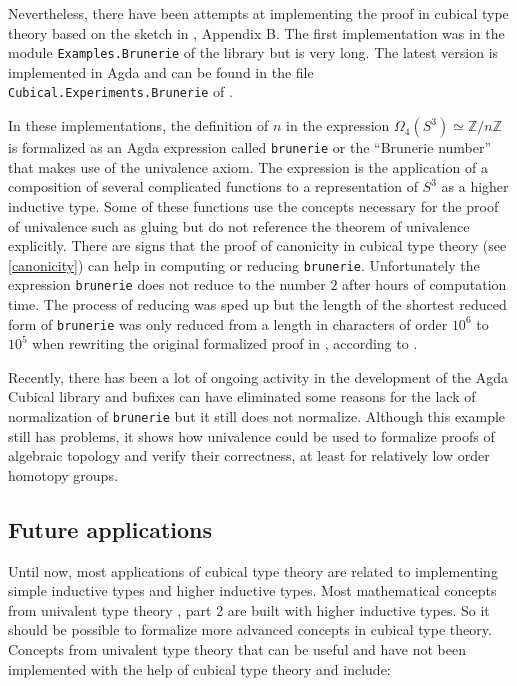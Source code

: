 \documentclass[12pt,a4paper,twoside,xetex]{book} %
\begin{document}
Nevertheless, there have been attempts at implementing the proof in cubical type 
theory based on the sketch in \cite{Brunerie2016}, Appendix B. The first 
implementation was in the module \texttt{Examples.Brunerie} of the library 
\cite{Moertberg2015} but is very long. The latest version is implemented in Agda 
and can be found in the file  \texttt{Cubical.Experiments.Brunerie} of 
\cite{Moertberg2018}. 

In these implementations, the definition of  $n$ in the expression 
$\Omega_4(S^3) \simeq \mathbb{Z}/n\mathbb{Z}$ is formalized as an Agda 
expression called \texttt{brunerie} or the ``Brunerie number'' that makes use 
of the univalence axiom. The expression is the application of a composition of 
several complicated functions to a representation of $S^3$ as a higher 
inductive type. Some of these functions use the concepts necessary for the proof 
of univalence such as gluing but do not reference the theorem of 
univalence explicitly. There are signs that the proof of canonicity in 
cubical type theory (see \cref{canonicity}) can help in computing 
or reducing \texttt{brunerie}. Unfortunately the expression 
\texttt{brunerie} does not reduce to the number $2$ after hours of 
computation time. The process of reducing was sped up but the length of the
shortest reduced form of  \texttt{brunerie} was  only 
reduced from a length in characters of order $10^6$ to $10^5$ when rewriting 
the original formalized proof \cite{Moertberg2015} in \cite{Moertberg2018},  
according to \cite{Brunerie2018}.

Recently, there has been a lot of ongoing activity in the development of the 
Agda Cubical library and bufixes can have eliminated some reasons for the lack 
of normalization of \texttt{brunerie} but it still does not normalize. Although this example still has problems, 
it shows how univalence could be used to formalize proofs of algebraic topology 
and verify their correctness, at least for relatively low order homotopy groups.

\subsection{Future applications}\label{futapp}

Until now, most applications of cubical type theory are related to implementing 
simple inductive types and higher inductive types. Most mathematical concepts 
from univalent type theory \cite{Voevodsky2013}, part 2 are built with higher 
inductive types. So it should be possible to formalize more advanced concepts in 
cubical type theory. Concepts from univalent type theory that can be useful and 
have not been implemented with the help of cubical type theory and 
\cite{Moertberg2018} include:
\end{document}
